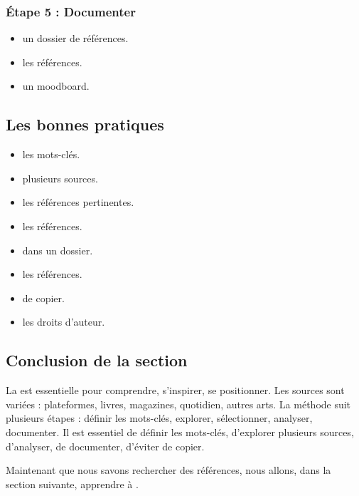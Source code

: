 \subsubsection{Étape 5 : Documenter}

\begin{itemize}
    \item {} un dossier de références.
    \item {} les références.
    \item {} un moodboard.
\end{itemize}

\subsection{Les bonnes pratiques}

\begin{itemize}
    \item {} les mots-clés.
    \item {} plusieurs sources.
    \item {} les références pertinentes.
    \item {} les références.
    \item {} dans un dossier.
    \item {} les références.
    \item {} de copier.
    \item {} les droits d'auteur.
\end{itemize}

\subsection*{Conclusion de la section}

La  est essentielle pour comprendre, s'inspirer, se positionner. Les sources sont variées : plateformes, livres, magazines, quotidien, autres arts. La méthode suit plusieurs étapes : définir les mots-clés, explorer, sélectionner, analyser, documenter. Il est essentiel de définir les mots-clés, d'explorer plusieurs sources, d'analyser, de documenter, d'éviter de copier.

Maintenant que nous savons rechercher des références, nous allons, dans la section suivante, apprendre à .

